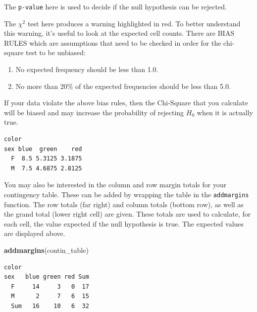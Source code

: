 \documentclass[twoside, 12pt]{article}
\newenvironment{Shaded}{\begin{snugshade}}{\end{snugshade}}
\newcommand{\KeywordTok}[1]{\textcolor[rgb]{0.13,0.29,0.53}{\textbf{{#1}}}}
\newcommand{\NormalTok}[1]{{#1}}
\begin{document}
The \texttt{p-value} here is used to decide if the null hypothesis can
be rejected.

The \(\chi^2\) test here produces a warning highlighted in red. To
better understand this warning, it's useful to look at the expected cell
counts. There are BIAS RULES which are assumptions that need to be
checked in order for the chi-square test to be unbiased:

\begin{enumerate}
\def\labelenumi{\arabic{enumi}.}
\item
  No expected frequency should be less than 1.0.
\item
  No more than 20\% of the expected frequencies should be less than 5.0.
\end{enumerate}

If your data violate the above bias rules, then the Chi-Square that you
calculate will be biased and may increase the probability of rejecting
\(H_0\) when it is actually true.

\begin{Shaded}
\end{Shaded}

\begin{Verbatim}[frame=single]
   color
sex blue  green    red
  F  8.5 5.3125 3.1875
  M  7.5 4.6875 2.8125
\end{Verbatim}

You may also be interested in the column and row margin totals for your
contingency table. These can be added by wrapping the table in the
\texttt{addmargins} function. The row totals (far right) and column
totals (bottom row), as well as the grand total (lower right cell) are
given. These totals are used to calculate, for each cell, the value
expected if the null hypothesis is true. The expected values are
displayed above.

\begin{Shaded}
\begin{Highlighting}[]
\KeywordTok{addmargins}\NormalTok{(contin_table)}
\end{Highlighting}
\end{Shaded}

\begin{Verbatim}[frame=single]
     color
sex   blue green red Sum
  F     14     3   0  17
  M      2     7   6  15
  Sum   16    10   6  32
\end{Verbatim}
\end{document}
